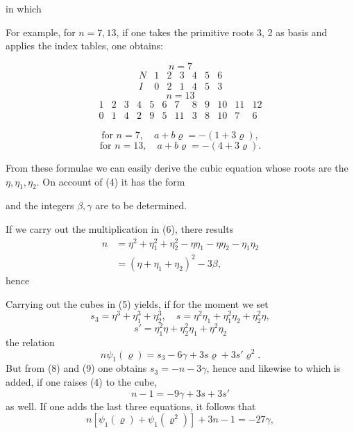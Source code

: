 in which


For example, for $n = 7, 13$, if one takes the primitive roots 3, 2 as basis and applies the index tables, one obtains:

\[
n = 7
\]
\[
\begin{array}{c|c|c|c|c|c|c}
N & 1 & 2 & 3 & 4 & 5 & 6 \\
\hline
I & 0 & 2 & 1 & 4 & 5 & 3
\end{array}
\]
\[
n = 13
\]
\[
\begin{array}{c|c|c|c|c|c|c|c|c|c|c|c}
1 & 2 & 3 & 4 & 5 & 6 & 7 & 8 & 9 & 10 & 11 & 12 \\
\hline
0 & 1 & 4 & 2 & 9 & 5 & 11 & 3 & 8 & 10 & 7 & 6
\end{array}
\]

\[
\text{for } n = 7, \quad a + b\varrho = -(1 + 3\varrho),
\]
\[
\text{for } n = 13, \quad a + b\varrho = -(4 + 3\varrho).
\]

From these formulae we can easily derive the cubic equation whose roots are the $\eta, \eta_1, \eta_2$. On account of (4) it has the form

and the integers $\beta, \gamma$ are to be determined.

If we carry out the multiplication in (6), there results
\[
\begin{aligned}
n &= \eta^2 + \eta_1^2 + \eta_2^2 - \eta\eta_1 - \eta\eta_2 - \eta_1\eta_2 \\
  &= (\eta + \eta_1 + \eta_2)^2 - 3\beta,
\end{aligned}
\]
hence

Carrying out the cubes in (5) yields, if for the moment we set
\[
s_3 = \eta^3 + \eta_1^3 + \eta_2^3, \quad s = \eta^2\eta_1 + \eta_1^2\eta_2 + \eta_2^2\eta,
\]
\[
s' = \eta_1^2\eta + \eta_2^2\eta_1 + \eta^2\eta_2
\]
the relation
\[
n\psi_1(\varrho) = s_3 - 6\gamma + 3s\varrho + 3s'\varrho^2.
\]
But from (8) and (9) one obtains $s_3 = -n - 3\gamma$, hence
and likewise
to which is added, if one raises (4) to the cube,
\[
n - 1 = -9\gamma + 3s + 3s'
\]
as well. If one adds the last three equations, it follows that
\[
n[\psi_1(\varrho) + \psi_1(\varrho^2)] + 3n - 1 = -27\gamma,
\]

